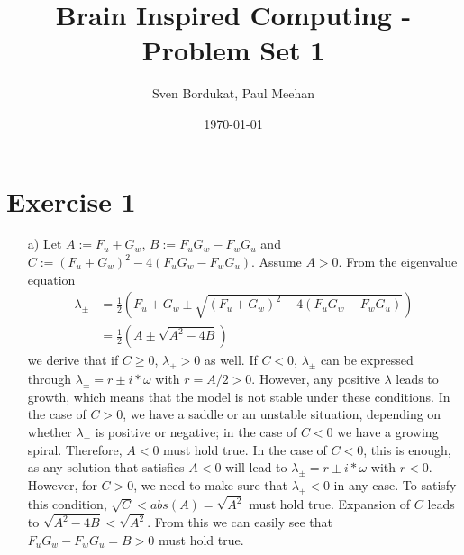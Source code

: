 \documentclass[a4paper]{article}
\begin{document}

\title{Brain Inspired Computing - Problem Set 1}

\author{Sven Bordukat, Paul Meehan}

\date{\today}

\maketitle

\section*{Exercise 1}
\begin{itemize}
    \item[a)]
    Let $A:=F_u+G_w$, $B:=F_uG_w-F_wG_u$ and $C:=(F_u+G_w)^2-4(F_uG_w-F_wG_u)$.
    Assume $A>0$. From the eigenvalue equation
    \begin{align*}
        \lambda_{\pm} &= \frac{1}{2}(F_u+G_w\pm\sqrt{(F_u+G_w)^2-4(F_uG_w-F_wG_u)})\\
                             &= \frac{1}{2}(A \pm \sqrt{A^2-4B})
        \label{eq:eigen}
    \end{align*}
    we derive that if $C\geq0$, $\lambda_+>0$ as well. If $C<0$, $\lambda_{\pm}$ can be
    expressed through $\lambda_{\pm}=r\pm i*\omega$ with $r=A/2>0$.
    However, any positive $\lambda$ leads to growth, which means that the model is
    not stable under these conditions. In the case of $C>0$, we have a saddle or
    an unstable situation, depending on whether $\lambda_-$ is positive or negative;
    in the case of $C<0$ we have a growing spiral.
    Therefore, $A<0$ must hold true.
    In the case of $C<0$, this is enough, as any solution that satisfies $A<0$
    will lead to $\lambda_{\pm}=r\pm i*\omega$ with $r<0$.
    However, for $C>0$, we need to make sure that $\lambda_+<0$ in any case.
    To satisfy this condition, $\sqrt{C}<abs(A)=\sqrt{A^2}$ must hold true.
    Expansion of $C$ leads to $\sqrt{A^2-4B}<\sqrt{A^2}$. From this we can easily
    see that $F_uG_w-F_wG_u=B>0$ must hold true.


\end{itemize}
\end{document}
